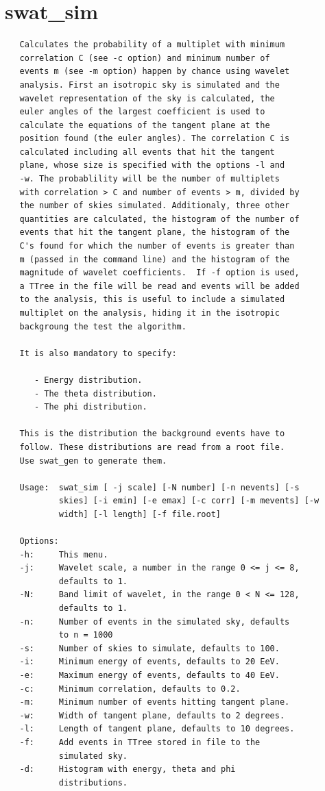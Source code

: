 \documentclass[12pt]{article}
\begin{document}
\section{swat\_sim}
{\bf \color{brown}
   \begin{lstlisting}
   Calculates the probability of a multiplet with minimum
   correlation C (see -c option) and minimum number of
   events m (see -m option) happen by chance using wavelet
   analysis. First an isotropic sky is simulated and the
   wavelet representation of the sky is calculated, the
   euler angles of the largest coefficient is used to
   calculate the equations of the tangent plane at the
   position found (the euler angles). The correlation C is
   calculated including all events that hit the tangent
   plane, whose size is specified with the options -l and
   -w. The probablility will be the number of multiplets
   with correlation > C and number of events > m, divided by
   the number of skies simulated. Additionaly, three other
   quantities are calculated, the histogram of the number of
   events that hit the tangent plane, the histogram of the
   C's found for which the number of events is greater than
   m (passed in the command line) and the histogram of the
   magnitude of wavelet coefficients.  If -f option is used,
   a TTree in the file will be read and events will be added
   to the analysis, this is useful to include a simulated
   multiplet on the analysis, hiding it in the isotropic
   backgroung the test the algorithm.
   
   It is also mandatory to specify:
   
      - Energy distribution.
      - The theta distribution.
      - The phi distribution.
   
   This is the distribution the background events have to
   follow. These distributions are read from a root file.
   Use swat_gen to generate them.

   Usage:  swat_sim [ -j scale] [-N number] [-n nevents] [-s
           skies] [-i emin] [-e emax] [-c corr] [-m mevents] [-w
           width] [-l length] [-f file.root]

   Options:
   -h:     This menu.
   -j:     Wavelet scale, a number in the range 0 <= j <= 8,
           defaults to 1.
   -N:     Band limit of wavelet, in the range 0 < N <= 128,
           defaults to 1.
   -n:     Number of events in the simulated sky, defaults
           to n = 1000
   -s:     Number of skies to simulate, defaults to 100.
   -i:     Minimum energy of events, defaults to 20 EeV.
   -e:     Maximum energy of events, defaults to 40 EeV.
   -c:     Minimum correlation, defaults to 0.2.
   -m:     Minimum number of events hitting tangent plane.
   -w:     Width of tangent plane, defaults to 2 degrees.
   -l:     Length of tangent plane, defaults to 10 degrees.
   -f:     Add events in TTree stored in file to the
           simulated sky.
   -d:     Histogram with energy, theta and phi
           distributions.
   \end{lstlisting}
}
\end{document}
